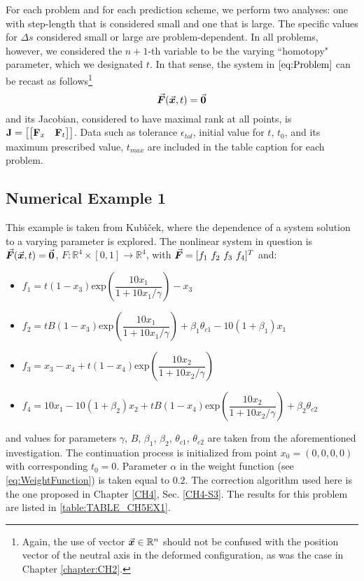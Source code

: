 For each problem and for each prediction scheme, we perform two analyses: one
with step-length that is considered small and one that is large. The specific 
values
for $\Delta s$ considered small or large are problem-dependent. In all
problems, however, we considered the $n+1$-th variable to be the varying 
``homotopy"
parameter, which we designated $t$. In that sense, the system in
$\ref{eq:Problem}$ can be recast as follows\footnote{Again, the use of vector 
$\vec{\bm{x}}\in\mathbb{R}^n$ should not be confused with the position vector of 
the neutral axis in the deformed configuration, as was the case in Chapter 
\ref{chapter:CH2}.}
\begin{equation}
	\vec{\bm{F}}(\vec{\bm{x}},t)=\vec{\bm{0}}
	\label{eq:MProb}
\end{equation}
and its Jacobian, considered to have maximal rank at all points, is $\mathbf{J} =
\bigl[\begin{bmatrix}
	\mathbf{F}_x & \mathbf{F}_t
\end{bmatrix}
\bigr]$. Data such as tolerance $\epsilon_{tol}$, initial value for $t$,
$t_0$, and its maximum prescribed value, $t_{max}$ are included in
the table caption for each problem.

\subsection{Numerical Example 1}

This example is taken from Kub{\'\i}{\v{c}}ek\cite{Kubicek76}, where the
dependence of a system solution to a varying parameter is explored. The 
nonlinear
system in question is $\vec{\bm{F}}(\vec{\bm{x}},t)=\vec{\bm{0}}$,
$F:\mathbb{R}^4\times[0,1]\rightarrow\mathbb{R}^4$, with $\bvec{F}=[f_1\ f_2\ 
f_3\ f_4]^T$ and:
\begin{itemize}
	\item[] $f_1 = 
	t(1-x_3)\text{exp}(\dfrac{10x_1}{1+10x_1^{}/\gamma})-x_3$
	\item[] $f_2 = t
	B(1-x_3)\text{exp}(\dfrac{10x_1}{1+10x_1^{}/\gamma})+\beta_1\theta_{c1}-10(1+\beta_1)x_1$
	\item[] $f_3 = x_3-x_4+t(1-x_4)\text{exp}(\dfrac{10x_2}{1+10x_2^{}/\gamma})$
	\item[] $f_4 = 10x_1-10(1+ \beta_2)x_2+t
	B(1-x_4)\text{exp}(\dfrac{10x_2}{1+10x_2^{}/\gamma})+\beta_2\theta_{c2}$
\end{itemize}
and values for parameters $\gamma$, $B$, $\beta_1$, $\beta_2$, $\theta_{c1}$,
$\theta_{c2}$ are taken from the aforementioned investigation. The continuation
process is initialized from point $x_0=(0,0,0,0)$ with corresponding
$t_0=0$. Parameter $\alpha$ in the weight function (see
\ref{eq:WeightFunction}) is taken equal to $0.2$. The correction algorithm used
here is the one proposed in Chapter \ref{CH4}, Sec. \ref{CH4-S3}. The results 
for this problem are listed in \ref{table:TABLE_CH5EX1}. 

